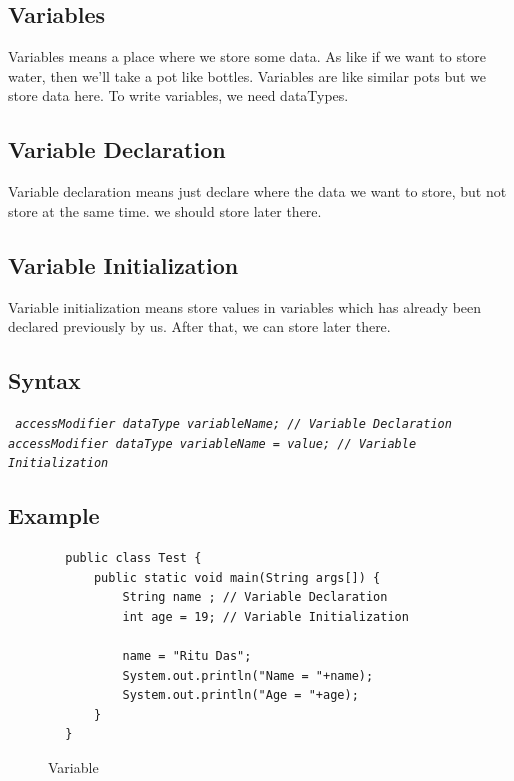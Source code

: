 \documentclass[openany]{book}  %
\begin{document}
\begin{flushleft}
    \section{Variables}
    Variables means a place where we store some data. As like if we want to store water, then we'll take a pot like bottles.
    Variables are like similar pots but we store data here. To write variables, we need dataTypes.
    \subsection{Variable Declaration}
    Variable declaration means just declare where the data we want to store, but not store at the same time. we should store later there.
    \subsection{Variable Initialization}
    Variable initialization means store values in variables which has already been declared previously by us. After that, we can store later there.
    \subsection{Syntax}
    \begin{center}
        \tt{
            \textit{accessModifier dataType variableName; // Variable Declaration}\\
            \null\textit{accessModifier dataType variableName = value; // Variable Initialization}
        }
    \end{center}
    \subsection{Example}
    \begin{center}
        \begin{verbatim}
        public class Test {
            public static void main(String args[]) {
                String name ; // Variable Declaration
                int age = 19; // Variable Initialization

                name = "Ritu Das";
                System.out.println("Name = "+name);
                System.out.println("Age = "+age);
            }
        }
    \end{verbatim}
    \end{center}
    \begin{figure}[htbp]
        \begin{center}
            \quad\quad{}
            \caption{Variable\cite{Ref3}}
        \end{center}
    \end{figure}

\end{flushleft}
\end{document}
